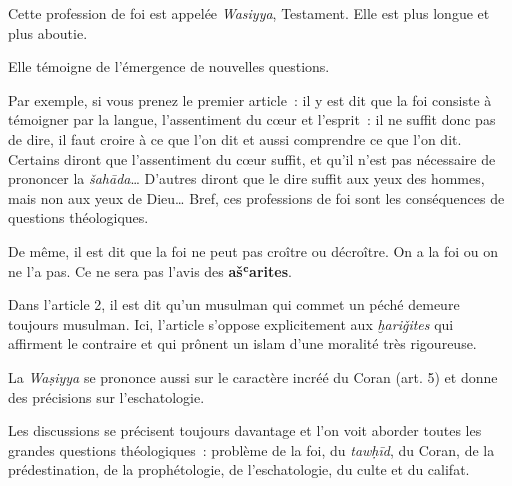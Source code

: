 
Cette profession de foi est appelée \emph{Wasiyya}, Testament. Elle est
plus longue et plus aboutie.


Elle témoigne de l'émergence de nouvelles questions.

Par exemple, si vous prenez le premier article~: il y est dit que la foi
consiste à témoigner par la langue, l'assentiment du cœur et l'esprit~:
il ne suffit donc pas de dire, il faut croire à ce que l'on dit et aussi
comprendre ce que l'on dit. Certains diront que l'assentiment du cœur
suffit, et qu'il n'est pas nécessaire de prononcer la
\emph{šahāda}\ldots{} D'autres diront que le dire suffit aux yeux des
hommes, mais non aux yeux de Dieu\ldots{} Bref, ces professions de foi
sont les conséquences de questions théologiques.

De même, il est dit que la foi ne peut pas croître ou décroître. On a la
foi ou on ne l'a pas. Ce ne sera pas l'avis des \textbf{ašʿarites}.

Dans l'article 2, il est dit qu'un musulman qui commet un péché demeure
toujours musulman. Ici, l'article s'oppose explicitement aux
\emph{ḫariǧites} qui affirment le contraire et qui prônent un islam
d'une moralité très rigoureuse.

La \emph{Waṣiyya} se prononce aussi sur le caractère incréé du Coran
(art. 5) et donne des précisions sur l'eschatologie.

Les discussions se précisent toujours davantage et l'on voit aborder
toutes les grandes questions théologiques~: problème de la foi, du
\emph{tawḥīd}, du Coran, de la prédestination, de la prophétologie, de
l'eschatologie, du culte et du califat.


